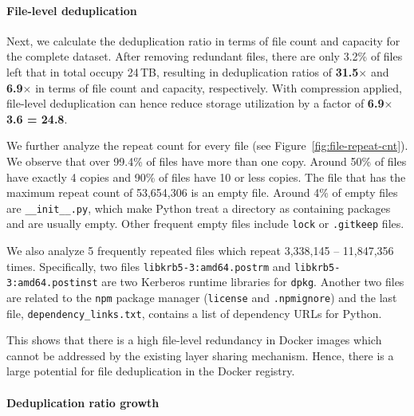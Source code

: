 \paragraph{File-level deduplication}
%
%
Next, we calculate the deduplication ratio in terms of file count and capacity for
the complete dataset.
%
After removing redundant files, there are only 3.2\% of files left that in total occupy
24\,TB, resulting in deduplication ratios of \textbf{31.5$\times$} and
\textbf{6.9$\times$} in terms of file count and capacity, respectively.
%
With compression applied, file-level deduplication can hence reduce storage utilization
by a factor of \textbf{6.9$\times$3.6 = 24.8}.
%


We further analyze the repeat count for every file (see Figure~\ref{fig:file-repeat-cnt}).
%
%
We observe that over 99.4\% of files have more than one copy.
%
Around 50\% of files have exactly 4 copies and 90\% of files have 10 or less
copies. 
%
The file that has the maximum repeat count of 53,654,306 is an empty file.
%
Around 4\% of empty files are \texttt{\_\_init\_\_.py}, which make Python treat a
directory as containing packages and are usually empty.
Other frequent empty files include
\texttt{lock} or \texttt{.gitkeep} files.

We also analyze 5 frequently repeated files which repeat 3,338,145 -- 11,847,356 times.
Specifically, two files 
\texttt{libkrb5-3:amd64.postrm} and \texttt{libkrb5-3:amd64.postinst}
are two Ker\-ber\-os runtime libraries for \texttt{dpkg}.
Another two files are related to the \texttt{npm} package manager (\texttt{license} and \texttt{.npmignore})
and the last file, \texttt{dependency\_links.txt}, contains a list of dependency URLs for Python.

This shows that there is a high file-level redundancy in Docker images
which cannot be addressed by the existing layer sharing mechanism. Hence,
there is a large potential for file deduplication in the Docker registry.

\paragraph{Deduplication ratio growth}

